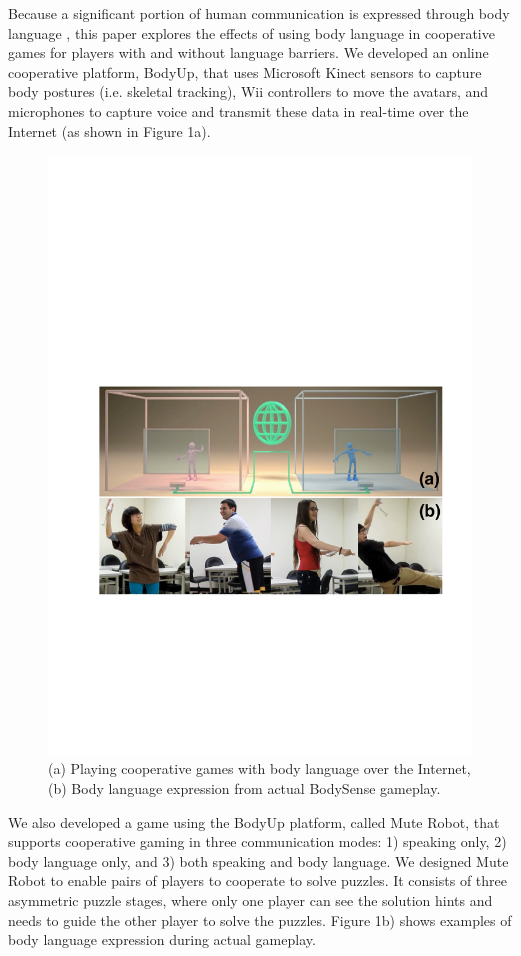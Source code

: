 Because a significant portion of human communication is expressed through body language \cite{GD2}, this paper explores the effects of using body language in cooperative games for players with and without language barriers. We developed an online cooperative platform, BodyUp, that uses Microsoft Kinect sensors to capture body postures (i.e. skeletal tracking), Wii controllers to move the avatars, and microphones to capture voice and transmit these data in real-time over the Internet (as shown in Figure 1a). 

\begin{figure}[t]
\centering
\includegraphics[width=0.9\columnwidth]{Figures/Topic.pdf}
\caption{(a) Playing cooperative games with body language over the Internet, (b) Body language expression from actual BodySense gameplay.}
\label{fig:Topic}
\end{figure}

We also developed a game using the BodyUp platform, called Mute Robot, that supports cooperative gaming in three communication modes: 1) speaking only, 2) body language only, and 3) both speaking and body language. We designed Mute Robot to enable pairs of players to cooperate to solve puzzles. It consists of three asymmetric puzzle stages, where only one player can see the solution hints and needs to guide the other player to solve the puzzles. Figure 1b) shows examples of body language expression during actual gameplay.

